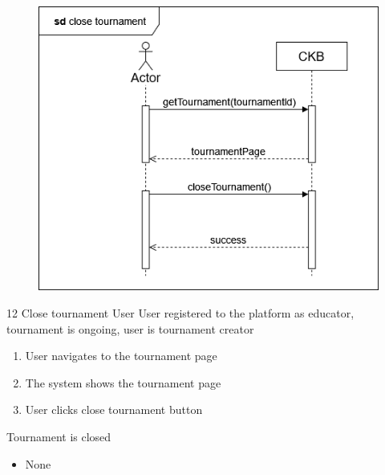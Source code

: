 \usecase
{
    \begin{figure}[H]
        \centering
        \includegraphics[width=\textwidth]{src/sd_diagrams/closetourn.png}
    \end{figure}
}
{12}
{Close tournament} %
{User} %
{User registered to the platform as educator, tournament is ongoing, user is tournament creator} %
{ %
    \begin{enumerate}
        \item User navigates to the tournament page
        \item The system shows the tournament page
        \item User clicks close tournament button
    \end{enumerate}
}
{Tournament is closed} %
{ %
    \begin{itemize}
        \item None
    \end{itemize}
}
{ %

}